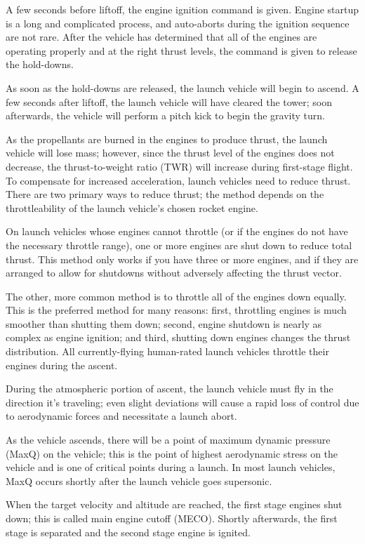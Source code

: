 A few seconds before liftoff, the engine ignition command is
given. Engine startup is a long and complicated process, and
auto-aborts during the ignition sequence are not rare. After the
vehicle has determined that all of the engines are operating properly
and at the right thrust levels, the command is given to release the
hold-downs.

As soon as the hold-downs are released, the launch vehicle will begin
to ascend. A few seconds after liftoff, the launch vehicle will have
cleared the tower; soon afterwards, the vehicle will perform a pitch
kick to begin the gravity turn.

As the propellants are burned in the engines to produce thrust, the
launch vehicle will lose mass; however, since the thrust level of the
engines does not decrease, the thrust-to-weight ratio (TWR) will
increase during first-stage flight. To compensate for increased
acceleration, launch vehicles need to reduce thrust. There are two
primary ways to reduce thrust; the method depends on the
throttleability of the launch vehicle's chosen rocket engine.

On launch vehicles whose engines cannot throttle (or if the engines do
not have the necessary throttle range), one or more engines are shut
down to reduce total thrust. This method only works if you have three
or more engines, and if they are arranged to allow for shutdowns
without adversely affecting the thrust vector.

The other, more common method is to throttle all of the engines down
equally. This is the preferred method for many reasons: first,
throttling engines is much smoother than shutting them down; second,
engine shutdown is nearly as complex as engine ignition; and third,
shutting down engines changes the thrust distribution. All
currently-flying human-rated launch vehicles throttle their engines
during the ascent.

During the atmospheric portion of ascent, the launch vehicle must fly
in the direction it's traveling; even slight deviations will cause a
rapid loss of control due to aerodynamic forces and necessitate a
launch abort.

As the vehicle ascends, there will be a point of maximum dynamic
pressure (MaxQ) on the vehicle; this is the point of highest
aerodynamic stress on the vehicle and is one of critical points during
a launch. In most launch vehicles, MaxQ occurs shortly after the
launch vehicle goes supersonic.

When the target velocity and altitude are reached, the first stage
engines shut down; this is called main engine cutoff (MECO). Shortly
afterwards, the first stage is separated and the second stage engine
is ignited.

